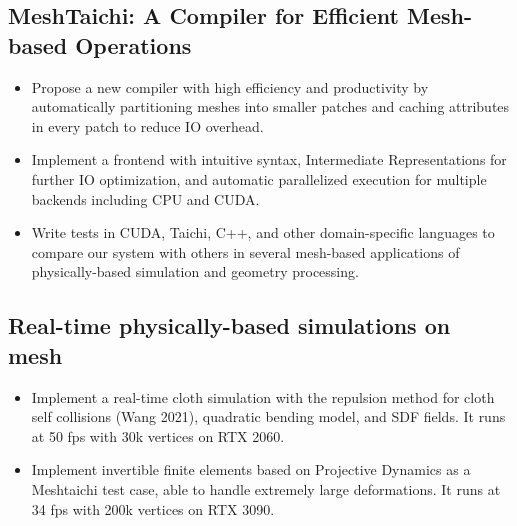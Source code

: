 \documentclass{resume}
\begin{document}
\subsection{\textbf{MeshTaichi: A Compiler for Efficient Mesh-based Operations}}
\begin{itemize}
  \item Propose a new compiler with high efficiency and productivity by automatically partitioning meshes into smaller patches and caching attributes in every patch to reduce IO overhead.
  \item Implement a frontend with intuitive syntax, Intermediate Representations for further IO optimization, and automatic parallelized execution for multiple backends including CPU and CUDA.
  \item Write tests in CUDA, Taichi, C++, and other domain-specific languages to compare our system with others in several mesh-based applications of physically-based simulation and geometry processing.
\end{itemize}

\subsection{\textbf{Real-time physically-based simulations on mesh}}
\begin{itemize}
  \item Implement a real-time cloth simulation with the repulsion method for cloth self collisions (Wang 2021), quadratic bending model, and SDF fields.
        It runs at 50 fps with 30k vertices on RTX 2060.
  \item Implement invertible finite elements based on Projective Dynamics as a Meshtaichi test case, able to handle extremely large deformations.
        It runs at 34 fps with 200k vertices on RTX 3090.

\end{itemize}
\end{document}
